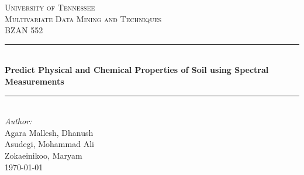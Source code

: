 \documentclass[12pt,letterpaper]{article}
\begin{document}
\begin{titlepage}

\newcommand{\HRule}{\rule{\linewidth}{0.5mm}} %

\center %
 

\textsc{\LARGE University of Tennessee}\\[1.5cm] %
\textsc{\Large Multivariate Data Mining and Techniques}\\[0.5cm] %
\textsc{\large BZAN 552}\\[0.5cm] %


\HRule \\[0.4cm]
{ \huge \bfseries Predict Physical and Chemical Properties of Soil using Spectral Measurements}\\[0.4cm] %
\HRule \\[1.5cm]
 

\Large \emph{Author:}\\
Agara Mallesh, Dhanush\\ %
Asudegi, Mohammad Ali\\
Zokaeinikoo, Maryam\\[3cm] %



{\large \today}\\[2cm] %


\end{titlepage}
\end{document}
